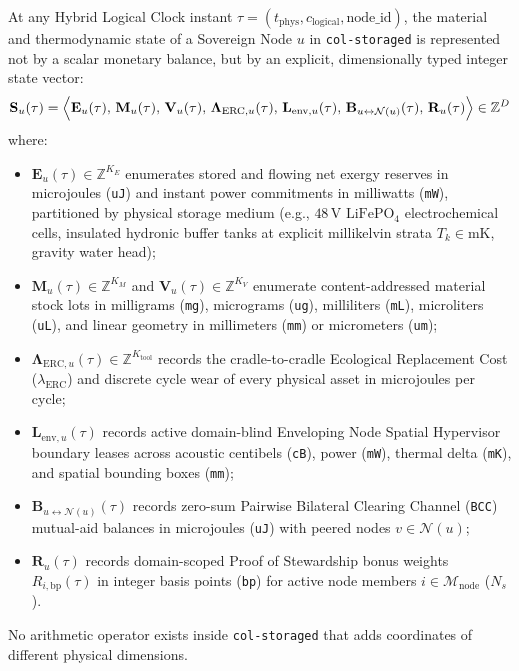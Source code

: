 \begin{definition}
\label{def:ch1-state-vector}
At any Hybrid Logical Clock instant $\tau = (t_{\mathrm{phys}}, c_{\mathrm{logical}}, \mathrm{node\_id})$, the material and thermodynamic state of a Sovereign Node $u$ in \texttt{col-storaged} is represented not by a scalar monetary balance, but by an explicit, dimensionally typed integer state vector:
\begin{equation}
\mathbf{S}_u(\tau) = \Bigl\langle \mathbf{E}_u(\tau), \, \mathbf{M}_u(\tau), \, \mathbf{V}_u(\tau), \, \mathbf{\Lambda}_{\mathrm{ERC},u}(\tau), \, \mathbf{L}_{\mathrm{env},u}(\tau), \, \mathbf{B}_{u \leftrightarrow \mathcal{N}(u)}(\tau), \, \mathbf{R}_{u}(\tau) \Bigr\rangle \in \mathbb{Z}^{D}
\label{eq:ch1-vector-ledger}
\end{equation}
where:
\begin{itemize}
    \item $\mathbf{E}_u(\tau) \in \mathbb{Z}^{K_E}$ enumerates stored and flowing net exergy reserves in microjoules (\texttt{uJ}) and instant power commitments in milliwatts (\texttt{mW}), partitioned by physical storage medium (e.g., $48\,\mathrm{V}$ $\mathrm{LiFePO_4}$ electrochemical cells, insulated hydronic buffer tanks at explicit millikelvin strata $T_k \in \mathrm{mK}$, gravity water head);
    \item $\mathbf{M}_u(\tau) \in \mathbb{Z}^{K_M}$ and $\mathbf{V}_u(\tau) \in \mathbb{Z}^{K_V}$ enumerate content-addressed material stock lots in milligrams (\texttt{mg}), micrograms (\texttt{ug}), milliliters (\texttt{mL}), microliters (\texttt{uL}), and linear geometry in millimeters (\texttt{mm}) or micrometers (\texttt{um});
    \item $\mathbf{\Lambda}_{\mathrm{ERC},u}(\tau) \in \mathbb{Z}^{K_{\mathrm{tool}}}$ records the cradle-to-cradle Ecological Replacement Cost ($\lambda_{\mathrm{ERC}}$) and discrete cycle wear of every physical asset in microjoules per cycle;
    \item $\mathbf{L}_{\mathrm{env},u}(\tau)$ records active domain-blind Enveloping Node Spatial Hypervisor boundary leases across acoustic centibels (\texttt{cB}), power (\texttt{mW}), thermal delta (\texttt{mK}), and spatial bounding boxes (\texttt{mm});
    \item $\mathbf{B}_{u \leftrightarrow \mathcal{N}(u)}(\tau)$ records zero-sum Pairwise Bilateral Clearing Channel (\texttt{BCC}) mutual-aid balances in microjoules (\texttt{uJ}) with peered nodes $v \in \mathcal{N}(u)$;
    \item $\mathbf{R}_{u}(\tau)$ records domain-scoped Proof of Stewardship bonus weights $R_{i,\mathrm{bp}}(\tau)$ in integer basis points (\texttt{bp}) for active node members $i \in \mathcal{M}_{\mathrm{node}}$ ($N_s$).
\end{itemize}
No arithmetic operator exists inside \texttt{col-storaged} that adds coordinates of different physical dimensions.
\end{definition}

